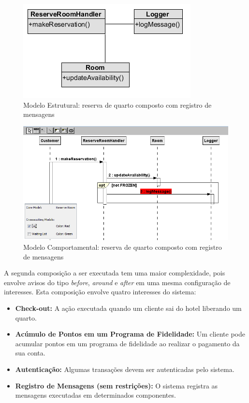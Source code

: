   \begin{figure}[!h]
	\centering
	\includegraphics{img/case_study_compound_1_structural.png}
	\caption{Modelo Estrutural: reserva de quarto composto com registro de mensagens}\label{fig:case_study_compound_1_structural}
  \end{figure}

  \begin{figure}[!h]
	\centering
	\includegraphics[scale=0.6]{img/case_study_compound_1.png}
	\caption{Modelo Comportamental: reserva de quarto composto com registro de mensagens}\label{fig:case_study_compound_1}
  \end{figure}

A segunda composição a ser executada tem uma maior complexidade, pois envolve avisos do tipo \textit{before}, \textit{around} e \textit{after} em uma
mesma configuração de interesses. Esta composição envolve quatro interesses do sistema:

\begin{itemize}
  \item \textbf{Check-out:} A ação executada quando um cliente sai do hotel liberando um quarto.
  \item \textbf{Acúmulo de Pontos em um Programa de Fidelidade:} Um cliente pode acumular pontos em um programa de fidelidade ao realizar o pagamento
  da sua conta.
  \item \textbf{Autenticação:} Algumas transações devem ser autenticadas pelo sistema.
  \item \textbf{Registro de Mensagens (sem restrições):} O sistema registra as mensagens executadas em determinados componentes.
\end{itemize}

